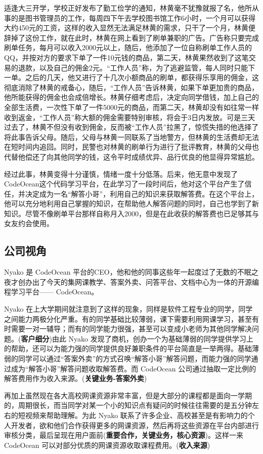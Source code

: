 \documentclass[a4paper]{ctexart}
\begin{document}
适逢大三开学，学校正好发布了勤工俭学的通知，林黄毫不犹豫就报了名，他所从事的是图书管理员的工作，每周四下午去学校图书馆工作6小时，一个月可以获得大约450元的工资，这样的收入显然无法满足林黄的需求，只干了一个月，林黄便辞掉了这份工作，就在此时，林黄在网上看到了刷单兼职的广告。广告称只要完成刷单任务，每月可以收入2000元以上，随后，他添加了一位自称刷单工作人员的QQ，并按对方的要求下单了一件10元钱的商品，第二天，林黄果然收到了这笔交易的退款，以及自己的佣金2元。“工作人员”称，为了逃避监管，每人同时只能下一单。之后的几天，他又进行了十几次小额商品的刷单，都获得乐享用的佣金，这彻底消除了林黄的戒备心，随后，“工作人员”告诉林黄，如果下单更加贵的商品，他所能获得的佣金也会成倍增长。林黄仔细考虑后，决定向同学借钱，加上自己的全部生活费，一次性下单了一件5000元的商品，而第二天，林黄却没有如往常一样收到返金，“工作人员”称大额的佣金需要特别审核，将会于3日内发放。可是三天过去了，林黄不但没有收到佣金，反而被“工作人员”拉黑了，惊慌失措的他选择了将此事告诉父母。随后，父母与林黄一同联系了当地警方，但林黄的生活费却无法在短时间内追回。同时，民警也对林黄的刷单行为进行了批评教育，林黄的父母也代替他偿还了向其他同学的钱，这令平时成绩优异、品行优良的他显得异常尴尬。

经过此事，林黄变得十分谨慎，情绪一度十分低落。后来，他无意中发现了CodeOcean这个代码学习平台，在此学习了一段时间后，他对这个平台产生了信任，并决定成为一名“解答小哥”，利用自己的知识来获取解答费。在这个平台上，他可以充分地利用自己掌握的知识，在帮助他人解答问题的同时，自己也学到了新知识。尽管不像刷单平台那样自称月入2000，但是在此收获的解答费也已足够其与女友约会使用。

\subsection{公司视角}
Nyako 是 CodeOcean 平台的CEO，他和他的同事这些年一起度过了无数的不眠之夜才创办出了今天的集网课教学、答案外卖、问答平台、文档中心为一体的开源编程学习平台—— CodeOcean。

Nyako 在上大学期间就注意到了这样的现象，同样是软件工程专业的同学，同学之间能力两极分化严重。有的同学基础比较薄弱，课下需要利用网课学习，甚至有时需要一对一辅导；而有的同学能力很强，甚至可以变成小老师为其他同学解决问题。(\textbf{客户细分})由此 Nyako 发现了商机，创办一个为基础薄弱的同学提供学习上的帮助，还可以为能力强的同学提供良好兼职条件的平台简直是一举两得。基础薄弱的同学可以通过“答案外卖”的方式召唤“解答小哥”解答问题，而能力强的同学通过成为“解答小哥”解答问题收取解答费。而 CodeOcean 公司通过抽取一定比例的解答费用作为收入来源。(\textbf{关键业务-答案外卖}) 

再加上虽然现在各大高校网课资源非常丰富，但是大部分的课程都是面向一学期的，周期很长，而当同学对某一个小的知识点有疑问的时候往往需要的是五分钟左右的短视频来帮助理解。为此 Nyako 联系了许多企业、高校甚至是有影响力的个人开发者，欲和他们合作获得更多的网课资源，然后再将这些资源在平台内部进行审核分类，最后呈现在用户面前(\textbf{重要合作，关键业务，核心资源})。这样一来 CodeOcean 可以对部分优质的网课资源收取课程费用。(\textbf{收入来源})
\end{document}
